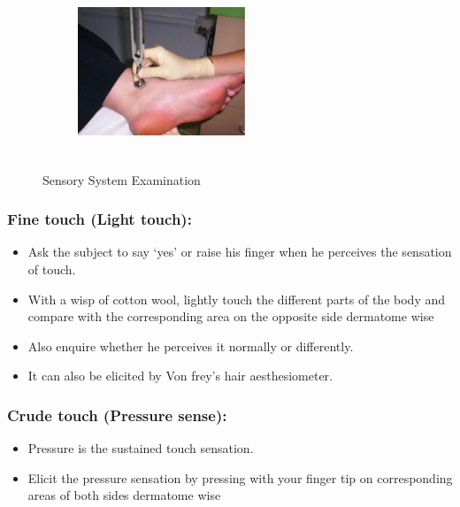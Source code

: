 \documentclass[a4paper,12pt,openany,twoside]{book}
\begin{document}
{\begin{figure}[H]
\begin{subfigure}[t]{.43\textwidth}
			\label{twoPointDiscrimination}
		\end{subfigure}
		\hspace{\fill}
		\begin{subfigure}[t]{.43\textwidth}
			\centering
			\includegraphics[width=5cm,height=5cm]{./clinicalPhysioPic/sensorySystem2.jpg}
			\label{vibrationSense}
		\end{subfigure}
		\caption*{Sensory System Examination}
		
	\end{figure}
	}
\subsubsection*{Fine touch (Light touch):}
\begin{itemize}
		\itemsep0em
\item{ Ask the subject to say ‘yes’ or raise his finger when he perceives the sensation of touch.}
\item{ With a wisp of cotton wool, lightly touch the different parts of the body and compare with the corresponding area on the opposite side dermatome wise}
\item{ Also enquire whether he perceives it normally or differently.}
\item{ It can also be elicited by Von frey’s hair aesthesiometer.}
\end{itemize}

\subsubsection*{Crude touch (Pressure sense):}
\begin{itemize}
		\itemsep0em
\item{Pressure is the sustained touch sensation.}
\item{Elicit the pressure sensation by pressing with your finger tip on 	corresponding areas of both sides dermatome wise}
\end{itemize}
\end{document}
